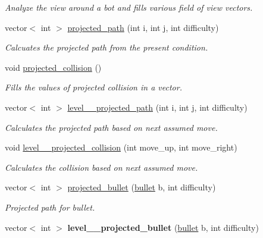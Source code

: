 \begin{DoxyCompactItemize}
\begin{DoxyCompactList}\small\item\em Analyze the view around a bot and fills various field of view vectors. \end{DoxyCompactList}\item 
vector$<$ int $>$ \hyperlink{classbots_a425014edfe2141ca13c98147507ca013}{projected\+\_\+path} (int i, int j, int difficulty)
\begin{DoxyCompactList}\small\item\em Calcuates the projected path from the present condition. \end{DoxyCompactList}\item 
\hypertarget{classbots_a7557015d7d0fe5285c03ee86c360b867}{void \hyperlink{classbots_a7557015d7d0fe5285c03ee86c360b867}{projected\+\_\+collision} ()}\label{classbots_a7557015d7d0fe5285c03ee86c360b867}

\begin{DoxyCompactList}\small\item\em Fills the values of projected collision in a vector. \end{DoxyCompactList}\item 
vector$<$ int $>$ \hyperlink{classbots_abc69770c70ca3a9d8ea7ebf6f4f91359}{level\+\_\+\_\+projected\+\_\+path} (int i, int j, int difficulty)
\begin{DoxyCompactList}\small\item\em Calculates the projected path based on next assumed move. \end{DoxyCompactList}\item 
void \hyperlink{classbots_a7e42df7ad71b464582f83935647f6468}{level\+\_\+\_\+projected\+\_\+collision} (int move\+\_\+up, int move\+\_\+right)
\begin{DoxyCompactList}\small\item\em Calculates the collision based on next assumed move. \end{DoxyCompactList}\item 
vector$<$ int $>$ \hyperlink{classbots_aff6c1e465921f81e32d3e9b04ea4c3de}{projected\+\_\+bullet} (\hyperlink{classbullet}{bullet} b, int difficulty)
\begin{DoxyCompactList}\small\item\em Projected path for bullet. \end{DoxyCompactList}\item 
\hypertarget{classbots_a5cf49ce84a7c4fa6f4ab7649908eb3f8}{vector$<$ int $>$ {\bfseries level\+\_\+\_\+projected\+\_\+bullet} (\hyperlink{classbullet}{bullet} b, int difficulty)}\label{classbots_a5cf49ce84a7c4fa6f4ab7649908eb3f8}


\end{DoxyCompactItemize}
